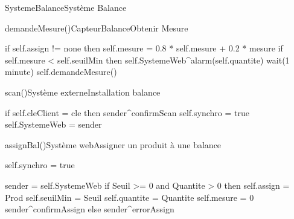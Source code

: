 \begin{OM}{SystemeBalance}{Système Balance}
    \begin{OMOperation}{demandeMesure()}{CapteurBalance}{Obtenir Mesure}
        \begin{OMMessages}
        \end{OMMessages}
        \OMNoPre
        \begin{OMPost}
            if self.assign != none then
            self.mesure = 0.8 * self.mesure + 0.2 * mesure
            if self.mesure < self.seuilMin then
            self.SystemeWeb^alarm(self.quantite)
            wait(1 minute)
            self.demandeMesure()
        \end{OMPost}
    \end{OMOperation}

    \begin{OMOperation}{scan()}{Système externe}{Installation balance}
        \begin{OMMessages}
        \end{OMMessages}
        \OMNoPre
        \begin{OMPost}
            if self.cleClient = cle then
            sender^confirmScan
            self.synchro = true
            self.SystemeWeb = sender
        \end{OMPost}
    \end{OMOperation}

    \begin{OMOperation}{assignBal()}{Système web}{Assigner un produit à une balance}
        \begin{OMMessages}
        \end{OMMessages}
        \begin{OMPre}
            self.synchro = true
        \end{OMPre}
        \begin{OMPost}
            sender = self.SystemeWeb
            if Seuil >= 0 and Quantite > 0 then
            self.assign = Prod
            self.seuilMin = Seuil
            self.quantite = Quantite
            self.mesure = 0
            sender^confirmAssign
            else
            sender^errorAssign
        \end{OMPost}
    \end{OMOperation}


\end{OM}
